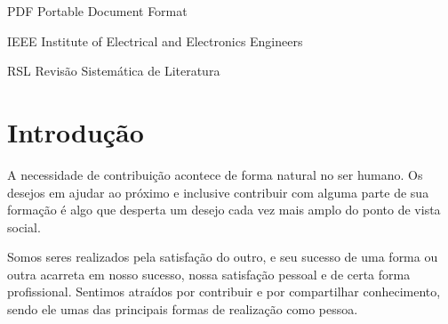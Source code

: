 \documentclass[
	12pt,               %
	openright,          %
	twoside,            %
	a4paper,            %
	english,            %
	brazil              %
	]{abntex2}
\begin{document}
\listoffigures*
\cleardoublepage

\listoftables*
\cleardoublepage

\begin{siglas}
  \item[PDF] Portable Document Format
  \item[IEEE] Institute of Electrical and Electronics Engineers
  \item[RSL] Revisão Sistemática de Literatura
\end{siglas}


\tableofcontents*
\cleardoublepage



\textual

\chapter[Introdução]{Introdução}

A necessidade de contribuição acontece de forma natural no ser humano. Os desejos em ajudar ao próximo e inclusive contribuir com alguma parte de sua formação é algo que desperta um desejo cada vez mais amplo do ponto de vista social.

Somos seres realizados pela satisfação do outro, e seu sucesso de uma forma ou outra acarreta em nosso sucesso, nossa satisfação pessoal e de certa forma profissional. Sentimos atraídos por contribuir e por compartilhar conhecimento, sendo ele umas das principais formas de realização como pessoa.
\end{document}
